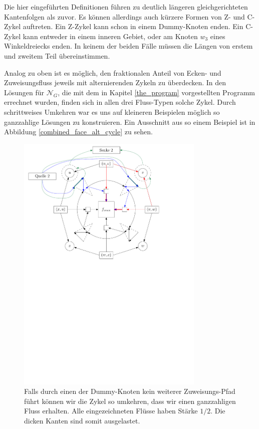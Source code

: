 \begin{remark}
Die hier eingeführten Definitionen führen zu deutlich längeren gleichgerichteten Kantenfolgen als zuvor. Es können allerdings auch kürzere Formen von Z- und C-Zykel auftreten. Ein Z-Zykel kann schon in einem Dummy-Knoten enden. Ein C-Zykel kann entweder in einem inneren Gebiet, oder am Knoten $w_3$ eines Winkel\-dreiecks enden. In keinem der beiden Fälle müssen die Längen von erstem und zweitem Teil übereinstimmen.
\end{remark}

Analog zu oben ist es möglich, den fraktionalen Anteil von Ecken- und Zuweisungsfluss jeweils mit alternierenden Zykeln zu überdecken. In den Lösungen für $\mathcal{N}_G$, die mit dem in Kapitel \ref{the_program} vorgestellten Programm errechnet wurden, finden sich in allen drei Fluss-Typen solche Zykel. Durch schrittweises Umkehren war es uns auf kleineren Beispielen möglich so ganzzahlige Lösungen zu konstruieren. Ein Ausschnitt aus so einem Beispiel ist in Abbildung \ref{combined_face_alt_cycle} zu sehen.

\begin{figure}[b]
\centering
\includegraphics[width=0.8\textwidth]{combined_face_alt_cycle2.pdf}
\caption{Falls durch einen der Dummy-Knoten kein weiterer Zuweisungs-Pfad führt können wir die Zykel so umkehren, dass wir einen ganzzahligen Fluss erhalten. Alle eingezeichneten Flüsse haben Stärke $1/2$. Die dicken Kanten sind somit ausgelastet.}
\label{combined_face_alt_cycle2}
\end{figure}


